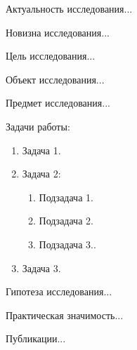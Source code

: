 \documentclass[../main.tex]{subfiles}
\begin{document}
	Актуальность исследования...

    Новизна исследования...

	Цель исследования...

	Объект исследования...

	Предмет исследования...

	Задачи работы:
	\begin{enumerate}[leftmargin=*]
		\item Задача 1.
		\item Задача 2:
		\begin{enumerate}
    		\item Подзадача 1.
    		\item Подзадача 2.
    		\item Подзадача 3..
		\end{enumerate}
		\item Задача 3.
	\end{enumerate}

    Гипотеза исследования...

	Практическая значимость...

	Публикации...
\end{document}
